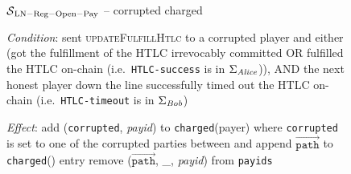 \begin{figure}[H]
  \begin{simulatorbox}{$\mathcal{S}{}_{\mathrm{LN - Reg - Open - Pay}}$ --
  corrupted charged}
    \begin{algorithmic}[1]
      \Statex \textit{Condition}:
      \Indent
        \State \alice{} sent \textsc{updateFulfillHtlc} to a corrupted player
        and either (got the fulfillment of the HTLC irrevocably committed OR
        fulfilled the HTLC on-chain (i.e.\ \texttt{HTLC-success} is in
        $\Sigma_{\mathit{Alice}}$)), AND the next honest player \bob{} down the line
        successfully timed out the HTLC on-chain (i.e.\ \texttt{HTLC-timeout} is
        in $\Sigma_{\mathit{Bob}}$)
      \EndIndent
      \Statex

      \Statex \textit{Effect}:
      \Indent
        \State add (\texttt{corrupted}, \textit{payid}) to
        \texttt{charged}(payer) where \texttt{corrupted} is set to one of the
        corrupted parties between \alice{} and \bob{}
          \State append $\overrightarrow{\mathtt{path}}$ to
          \texttt{charged}(\alice) entry
        \EndIf
        \State remove ($\overrightarrow{\mathtt{path}}$, \_,
        \textit{payid}) from \texttt{payids}
      \EndIndent
    \end{algorithmic}
  \end{simulatorbox}
  \caption{}
  \label{alg:sim:resolvepay:corrupted:fig}
\end{figure}

